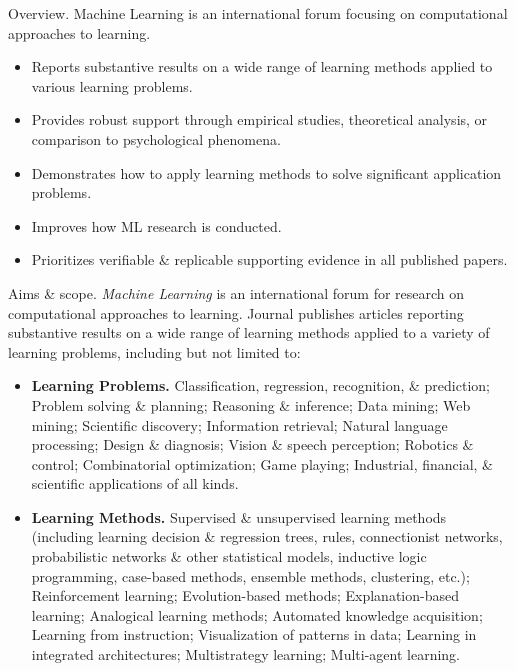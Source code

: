 \documentclass{article}
\begin{document}
\begin{enumerate}
	{\sf Overview.} Machine Learning is an international forum focusing on computational approaches to learning.
	\begin{itemize}
		\item Reports substantive results on a wide range of learning methods applied to various learning problems.
		\item Provides robust support through empirical studies, theoretical analysis, or comparison to psychological phenomena.
		\item Demonstrates how to apply learning methods to solve significant application problems.
		\item Improves how ML research is conducted.
		\item Prioritizes verifiable \& replicable supporting evidence in all published papers.
	\end{itemize}
	{\sf Aims \& scope.} {\it Machine Learning} is an international forum for research on computational approaches to learning. Journal publishes articles reporting substantive results on a wide range of learning methods applied to a variety of learning problems, including but not limited to:
	\begin{itemize}
		\item {\bf Learning Problems.} Classification, regression, recognition, \& prediction; Problem solving \& planning; Reasoning \& inference; Data mining; Web mining; Scientific discovery; Information retrieval; Natural language processing; Design \& diagnosis; Vision \& speech perception; Robotics \& control; Combinatorial optimization; Game playing; Industrial, financial, \& scientific applications of all kinds.
		\item {\bf Learning Methods.} Supervised \& unsupervised learning methods (including learning decision \& regression trees, rules, connectionist networks, probabilistic networks \& other statistical models, inductive logic programming, case-based methods, ensemble methods, clustering, etc.); Reinforcement learning; Evolution-based methods; Explanation-based learning; Analogical learning methods; Automated knowledge acquisition; Learning from instruction; Visualization of patterns in data; Learning in integrated architectures; Multistrategy learning; Multi-agent learning.
	\end{itemize}

\end{enumerate}
\end{document}
